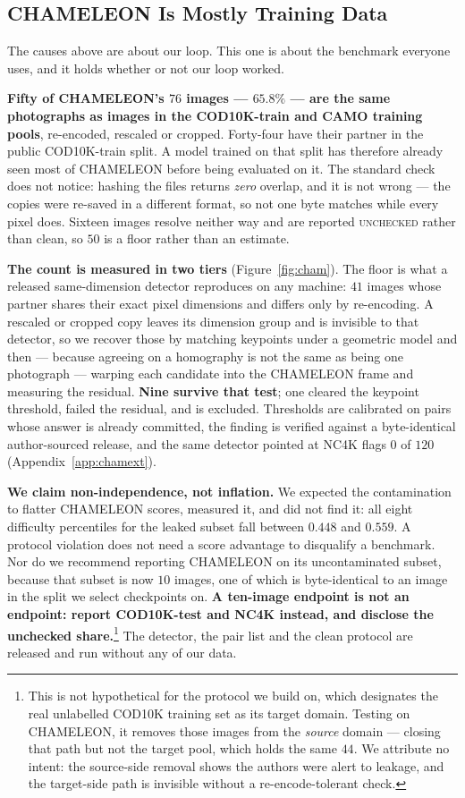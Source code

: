 \documentclass{article}
\begin{document}
\subsection{CHAMELEON Is Mostly Training Data}
\label{sec:contamination}
The causes above are about our loop. This one is about the benchmark everyone uses, and it holds
whether or not our loop worked.

\textbf{Fifty of CHAMELEON's $76$ images --- $65.8\%$ --- are the same photographs as images in the
COD10K-train and CAMO training pools}, re-encoded, rescaled or cropped. Forty-four have their
partner in the public COD10K-train split. A model trained on that split has therefore already seen
most of CHAMELEON before being evaluated on it. The standard check does not notice: hashing the
files returns \emph{zero} overlap, and it is not wrong --- the copies were re-saved in a different
format, so not one byte matches while every pixel does. Sixteen images resolve neither way and are
reported \textsc{unchecked} rather than clean, so $50$ is a floor rather than an estimate.

\textbf{The count is measured in two tiers} (Figure~\ref{fig:cham}). The floor is what a released
same-dimension detector reproduces on any machine: $41$ images whose partner shares their exact
pixel dimensions and differs only by re-encoding. A rescaled or cropped copy leaves its dimension
group and is invisible to that detector, so we recover those by matching keypoints under a geometric
model and then --- because agreeing on a homography is not the same as being one photograph ---
warping each candidate into the CHAMELEON frame and measuring the residual. \textbf{Nine survive
that test}; one cleared the keypoint threshold, failed the residual, and is excluded. Thresholds are
calibrated on pairs whose answer is already committed, the finding is verified against a
byte-identical author-sourced release, and the same detector pointed at NC4K flags $0$ of $120$
(Appendix~\ref{app:chamext}).

\textbf{We claim non-independence, not inflation.} We expected the contamination to flatter
CHAMELEON scores, measured it, and did not find it: all eight difficulty percentiles for the leaked
subset fall between $0.448$ and $0.559$. A protocol violation does not need a score advantage to
disqualify a benchmark. Nor do we recommend reporting CHAMELEON on its uncontaminated subset,
because that subset is now $10$ images, one of which is byte-identical to an
image in the split we select checkpoints on. \textbf{A ten-image endpoint is not an endpoint:
report COD10K-test and NC4K instead, and disclose the unchecked share.}\footnote{This is not
hypothetical for the protocol we build on, which designates the real unlabelled COD10K training set
as its target domain. Testing on CHAMELEON, it removes those images from the \emph{source} domain
--- closing that path but not the target pool, which holds the same $44$. We attribute no intent:
the source-side removal shows the authors were alert to leakage, and the target-side path is
invisible without a re-encode-tolerant check.} The detector, the pair list and the clean protocol
are released and run without any of our data.
\end{document}
